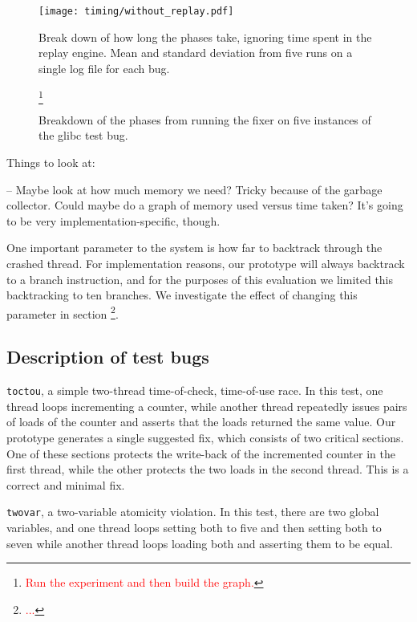 \documentclass[10pt,twocolumn,preprint,natbib,authoryear]{sigplanconf}
\newcommand{\editorial}[1]{\textcolor{red}{\footnote{\textcolor{red}{#1}}}}
\begin{document}
\begin{figure*}
\texttt{[image: timing/without\_replay.pdf]}
\caption{Break down of how long the phases take, ignoring time spent
  in the replay engine.  Mean and standard deviation from five runs on
  a single log file for each bug.}
\end{figure*}

\begin{figure*}
\editorial{Run the experiment and then build the graph.}
\caption{Breakdown of the phases from running the fixer on five instances
  of the glibc test bug.}
\end{figure*}

Things to look at:

-- Maybe look at how much memory we need?  Tricky because of the
garbage collector.  Could maybe do a graph of memory used versus time
taken?  It's going to be very implementation-specific, though.

One important parameter to the system is how far to backtrack through
the crashed thread.  For implementation reasons, our prototype will
always backtrack to a branch instruction, and for the purposes of this
evaluation we limited this backtracking to ten branches.  We
investigate the effect of changing this parameter in section
\editorial{...}.

\subsection{Description of test bugs}

\verb|toctou|, a simple two-thread time-of-check, time-of-use race.
In this test, one thread loops incrementing a counter, while another
thread repeatedly issues pairs of loads of the counter and asserts
that the loads returned the same value.  Our prototype generates a
single suggested fix, which consists of two critical sections.  One of
these sections protects the write-back of the incremented counter in
the first thread, while the other protects the two loads in the second
thread.  This is a correct and minimal fix.

\verb|twovar|, a two-variable atomicity violation.  In this test,
there are two global variables, and one thread loops setting both to
five and then setting both to seven while another thread loops loading
both and asserting them to be equal.
\end{document}
